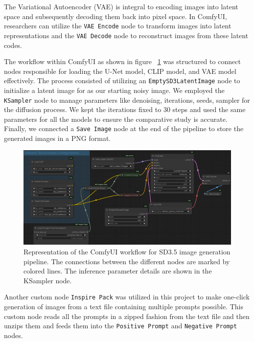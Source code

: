 \documentclass{article}
\begin{document}
The Variational Autoencoder (VAE) \cite{enwiki:1261565566} is integral to encoding images into latent space and subsequently decoding them back into pixel space. In ComfyUI, researchers can utilize the \texttt{VAE Encode} node to transform images into latent representations and the \texttt{VAE Decode} node to reconstruct images from these latent codes.

The workflow within ComfyUI as shown in figure ~\ref{fig:comfyui-workflow} was structured to connect nodes responsible for loading the U-Net model, CLIP model, and VAE model effectively. The process consisted of utilizing an \texttt{EmptySD3LatentImage} node to initialize a latent image for as our starting noisy image. We employed the \texttt{KSampler} node to manage parameters like denoising, iterations, seeds, sampler for the diffusion process. We kept the iterations fixed to 30 steps and used the same parameters for all the models to ensure the comparative study is accurate.
Finally, we connected a \texttt{Save Image} node at the end of the pipeline to store the generated images in a PNG format.

\begin{figure}
	\centering
	\includegraphics[width=1\linewidth]{ComfyUI-workflow}
	\caption{Representation of the ComfyUI workflow for SD3.5 image generation pipeline. The connections between the different nodes are marked by colored lines. The inference parameter details are shown in the KSampler node.}
	\label{fig:comfyui-workflow}
\end{figure}

Another custom node \texttt{Inspire Pack} \cite{inspirepack} was utilized in this project to make one-click generation of images from a text file containing multiple prompts possible. This custom node reads all the prompts in a zipped fashion from the text file and then unzips them and feeds them into the \texttt{Positive Prompt} and \texttt{Negative Prompt} nodes. 
\end{document}
